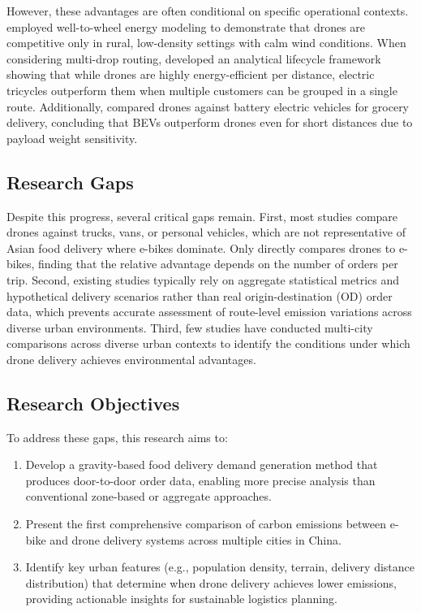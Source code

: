 \documentclass[11pt]{article}
\begin{document}
However, these advantages are often conditional on specific operational contexts. \textcite{kirschstein_comparison_2020} employed well-to-wheel energy modeling to demonstrate that drones are competitive only in rural, low-density settings with calm wind conditions. When considering multi-drop routing, \textcite{figliozzi_lifecycle_2017} developed an analytical lifecycle framework showing that while drones are highly energy-efficient per distance, electric tricycles outperform them when multiple customers can be grouped in a single route. Additionally, \textcite{yowtak_comparative_2020} compared drones against battery electric vehicles for grocery delivery, concluding that BEVs outperform drones even for short distances due to payload weight sensitivity.

\subsection{Research Gaps}

Despite this progress, several critical gaps remain. First, most studies compare drones against trucks, vans, or personal vehicles, which are not representative of Asian food delivery where e-bikes dominate. Only \textcite{li_beyond_2025} directly compares drones to e-bikes, finding that the relative advantage depends on the number of orders per trip. Second, existing studies typically rely on aggregate statistical metrics and hypothetical delivery scenarios rather than real origin-destination (OD) order data, which prevents accurate assessment of route-level emission variations across diverse urban environments. Third, few studies have conducted multi-city comparisons across diverse urban contexts to identify the conditions under which drone delivery achieves environmental advantages.

\subsection{Research Objectives}

To address these gaps, this research aims to:
\begin{enumerate}
  \item Develop a gravity-based food delivery demand generation method that produces door-to-door order data, enabling more precise analysis than conventional zone-based or aggregate approaches.
  \item Present the first comprehensive comparison of carbon emissions between e-bike and drone delivery systems across multiple cities in China.
  \item Identify key urban features (e.g., population density, terrain, delivery distance distribution) that determine when drone delivery achieves lower emissions, providing actionable insights for sustainable logistics planning.
\end{enumerate}
\end{document}

